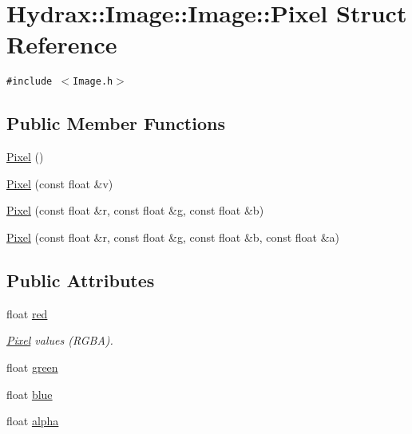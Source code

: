 \hypertarget{struct_hydrax_1_1_image_1_1_pixel}{
\section{Hydrax::Image::Image::Pixel Struct Reference}
\label{struct_hydrax_1_1_image_1_1_pixel}
}
{\tt \#include $<$Image.h$>$}

\subsection*{Public Member Functions}
\begin{CompactItemize}
\item 
\hyperlink{struct_hydrax_1_1_image_1_1_pixel_7bce5f29e8725b3da2102c9d48236fa2}{Pixel} ()
\item 
\hyperlink{struct_hydrax_1_1_image_1_1_pixel_eb126e432cef9cba4fdbf34c6b445833}{Pixel} (const float \&v)
\item 
\hyperlink{struct_hydrax_1_1_image_1_1_pixel_c6035417ad647ad57c275f462b8cfab9}{Pixel} (const float \&r, const float \&g, const float \&b)
\item 
\hyperlink{struct_hydrax_1_1_image_1_1_pixel_ea61a7146cef99ad5c706d6fda0c2601}{Pixel} (const float \&r, const float \&g, const float \&b, const float \&a)
\end{CompactItemize}
\subsection*{Public Attributes}
\begin{CompactItemize}
\item 
float \hyperlink{struct_hydrax_1_1_image_1_1_pixel_4a09b94547a9b223e80314cd1f2cd152}{red}
\begin{CompactList}\small\item\em \hyperlink{struct_hydrax_1_1_image_1_1_pixel}{Pixel} values (RGBA). \item\end{CompactList}\item 
float \hyperlink{struct_hydrax_1_1_image_1_1_pixel_615a2726f584af197d21dbaa724631e0}{green}
\item 
float \hyperlink{struct_hydrax_1_1_image_1_1_pixel_f27e1b75fc1935a62f3af20bc8f81eae}{blue}
\item 
float \hyperlink{struct_hydrax_1_1_image_1_1_pixel_7e6eb6af2e026d08811f14f26de0bc87}{alpha}
\end{CompactItemize}


